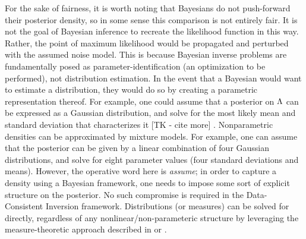 \begin{ex}
For the sake of fairness, it is worth noting that Bayesians do not push-forward their posterior density, so in some sense this comparison is not entirely fair.
It is not the goal of Bayesian inference to recreate the likelihood function in this way.
Rather, the point of maximum likelihood would be propagated and perturbed with the assumed noise model.
This is because Bayesian inverse problems are fundamentally posed as parameter-identification (an optimization to be performed), not distribution estimation.
In the event that a Bayesian would want to estimate a distribution, they would do so by creating a parametric representation thereof.
For example, one could assume that a posterior on ${\Lambda}$ can be expressed as a Gaussian distribution, and solve for the most likely mean and standard deviation that characterizes it [TK - cite more] \cite{Smith}.
Nonparametric densities can be approximated by mixture models.
For example, one can assume that the posterior can be given by a linear combination of four Gaussian distributions, and solve for eight parameter values (four standard deviations and means).
However, the operative word here is \emph{assume}; in order to capture a density using a Bayesian framework, one needs to impose some sort of explicit structure on the posterior.
No such compromise is required in the Data-Consistent Inversion framework.
Distributions (or measures) can be solved for directly, regardless of any nonlinear/non-parameteric structure by leveraging the measure-theoretic approach described in \cite{BE13} or \cite{BJW18}.

\end{ex}
